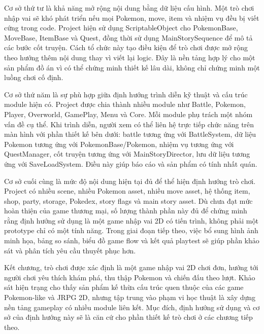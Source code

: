 Cơ sở thứ tư là khả năng mở rộng nội dung bằng dữ liệu cấu hình. Một trò chơi nhập vai sẽ khó phát triển nếu mọi Pokemon, move, item và nhiệm vụ đều bị viết cứng trong code. Project hiện sử dụng ScriptableObject cho PokemonBase, MoveBase, ItemBase và Quest, đồng thời sử dụng MainStorySequence để mô tả các bước cốt truyện. Cách tổ chức này tạo điều kiện để trò chơi được mở rộng theo hướng thêm nội dung thay vì viết lại logic. Đây là nền tảng hợp lý cho một sản phẩm đồ án vì có thể chứng minh thiết kế lâu dài, không chỉ chứng minh một luồng chơi cố định.

Cơ sở thứ năm là sự phù hợp giữa định hướng trình diễn kỹ thuật và cấu trúc module hiện có. Project được chia thành nhiều module như Battle, Pokemon, Player, Overworld, GamePlay, Menu và Core. Mỗi module phụ trách một nhóm vấn đề cụ thể. Khi trình diễn, người xem có thể liên hệ trực tiếp chức năng trên màn hình với phần thiết kế bên dưới: battle tương ứng với BattleSystem, dữ liệu Pokemon tương ứng với PokemonBase/Pokemon, nhiệm vụ tương ứng với QuestManager, cốt truyện tương ứng với MainStoryDirector, lưu dữ liệu tương ứng với SaveLoadSystem. Điều này giúp báo cáo và sản phẩm có tính nhất quán.

Cơ sở cuối cùng là mức độ nội dung hiện tại đủ để thể hiện định hướng trò chơi. Project có nhiều scene, nhiều Pokemon asset, nhiều move asset, hệ thống item, shop, party, storage, Pokedex, story flags và main story asset. Dù chưa đạt mức hoàn thiện của game thương mại, số lượng thành phần này đủ để chứng minh rằng định hướng sử dụng là một game nhập vai 2D có tiến trình, không phải một prototype chỉ có một tính năng. Trong giai đoạn tiếp theo, việc bổ sung hình ảnh minh họa, bảng so sánh, biểu đồ game flow và kết quả playtest sẽ giúp phần khảo sát và phân tích yêu cầu thuyết phục hơn.

Kết chương, trò chơi được xác định là một game nhập vai 2D chơi đơn, hướng tới người chơi yêu thích khám phá, thu thập Pokemon và chiến đấu theo lượt. Khảo sát hiện trạng cho thấy sản phẩm kế thừa cấu trúc quen thuộc của các game Pokemon-like và JRPG 2D, nhưng tập trung vào phạm vi học thuật là xây dựng nền tảng gameplay có nhiều module liên kết. Mục đích, định hướng sử dụng và cơ sở của định hướng này sẽ là căn cứ cho phần thiết kế trò chơi ở các chương tiếp theo.
